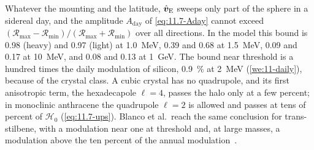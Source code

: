 Whatever the mounting and the latitude, $\hat{\bm{v}}_{\mathrm{E}}$ sweeps only part of the sphere in a sidereal day, and the amplitude $A_{\mathrm{day}}$ of \cref{eq:11.7-Aday} cannot exceed $(\mathcal{R}_{\mathrm{max}} - \mathcal{R}_{\mathrm{min}})/(\mathcal{R}_{\mathrm{max}} + \mathcal{R}_{\mathrm{min}})$ over all directions. In the model this bound is 0.98 (heavy) and 0.97 (light) at \SI{1.0}{MeV}, 0.39 and 0.68 at \SI{1.5}{MeV}, 0.09 and 0.17 at \SI{10}{MeV}, and 0.08 and 0.13 at \SI{1}{GeV}. The bound near threshold is a hundred times the daily modulation of silicon, \SI{0.9}{\percent} at \SI{2}{MeV} (\cref{we:11-daily}), because of the crystal class. A cubic crystal has no quadrupole, and its first anisotropic term, the hexadecapole $\ell = 4$, passes the halo only at a few percent; in monoclinic anthracene the quadrupole $\ell = 2$ is allowed and passes at tens of percent of $\mathcal{H}_0$ (\cref{eq:11.7-ups}). Blanco et al.\ reach the same conclusion for trans-stilbene, with a modulation near one at threshold and, at large masses, a modulation above the ten percent of the annual modulation~\cite[Sects.~V, VI]{blanco2021dark}.
